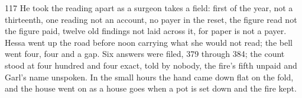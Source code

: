 \begin{CRchronicle}{117}
He took the reading apart as a surgeon takes a field: first of the year, not a thirteenth, one reading not an account, no payer in the reset, the figure read not the figure paid, twelve old findings not laid across it, for paper is not a payer. Hessa went up the road before noon carrying what she would not read; the bell went four, four and a gap. Six answers were filed, 379 through 384; the count stood at four hundred and four exact, told by nobody, the fire’s fifth unpaid and Garl’s name unspoken. In the small hours the hand came down flat on the fold, and the house went on as a house goes when a pot is set down and the fire kept.
\end{CRchronicle}
